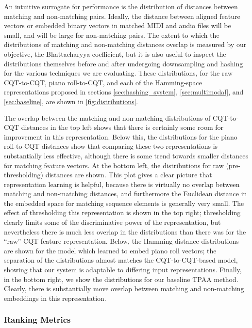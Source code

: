 An intuitive surrogate for performance is the distribution of distances between matching and non-matching pairs.
Ideally, the distance between aligned feature vectors or embedded binary vectors in matched MIDI and audio files will be small, and will be large for non-matching pairs.
The extent to which the distributions of matching and non-matching distances overlap is measured by our objective, the Bhattacharyya coefficient, but it is also useful to inspect the distributions themselves before and after undergoing downsampling and hashing for the various techniques we are evaluating.
These distributions, for the raw CQT-to-CQT, piano roll-to-CQT, and each of the Hamming-space representations proposed in sections \ref{sec:hashing_system}, \ref{sec:multimodal}, and \ref{sec:baseline}, are shown in \cref{fig:distributions}.

The overlap between the matching and non-matching distributions of CQT-to-CQT distances in the top left shows that there is certainly some room for improvement in this representation.
Below this, the distributions for the piano roll-to-CQT distances show that comparing these two representations is substantially less effective, although there is some trend towards smaller distances for matching feature vectors.
At the bottom left, the distributions for raw (pre-thresholding) distances are shown.
This plot gives a clear picture that representation learning is helpful, because there is virtually no overlap between matching and non-matching distances, and furthermore the Euclidean distance in the embedded space for matching sequence elements is generally very small.
The effect of thresholding this representation is shown in the top right; thresholding clearly limits some of the discriminative power of the representation, but nevertheless there is much less overlap in the distributions than there was for the ``raw'' CQT feature representation.
Below, the Hamming distance distributions are shown for the model which learned to embed piano roll vectors; the separation of the distributions almost matches the CQT-to-CQT-based model, showing that our system is adaptable to differing input representations.
Finally, in the bottom right, we show the distributions for our baseline TPAA method.
Clearly, there is substantially move overlap between matching and non-matching embeddings in this representation.

\subsubsection{Ranking Metrics}
\label{sec:ranking}

